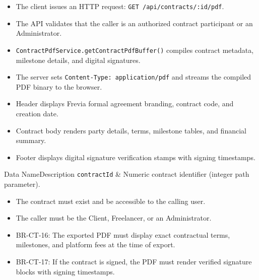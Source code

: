 \begin{itemize}[leftmargin=1.6em,topsep=3pt,itemsep=2pt,parsep=0pt,label=$\bullet$]
      \item The client issues an HTTP request: \texttt{GET /api/contracts/:id/pdf}.
      \item The API validates that the caller is an authorized contract participant or an Administrator.
      \item \texttt{ContractPdfService.getContractPdfBuffer()} compiles contract metadata, milestone details, and digital signatures.
      \item The server sets \texttt{Content-Type: application/pdf} and streams the compiled PDF binary to the browser.
\end{itemize}

\begin{itemize}[leftmargin=1.6em,topsep=3pt,itemsep=2pt,parsep=0pt,label=$\bullet$]
      \item Header displays Frevia formal agreement branding, contract code, and creation date.
      \item Contract body renders party details, terms, milestone tables, and financial summary.
      \item Footer displays digital signature verification stamps with signing timestamps.
\end{itemize}


\begin{specdatatable}{Data Name}{Description}
      \texttt{contractId} & Numeric contract identifier (integer path parameter).\\ \hline
\end{specdatatable}

\begin{itemize}[leftmargin=1.6em,topsep=3pt,itemsep=2pt,parsep=0pt,label=$\bullet$]
      \item The contract must exist and be accessible to the calling user.
      \item The caller must be the Client, Freelancer, or an Administrator.
\end{itemize}

\begin{itemize}[leftmargin=1.6em,topsep=3pt,itemsep=2pt,parsep=0pt,label=$\bullet$]\brrulelist
      \item BR-CT-16: The exported PDF must display exact contractual terms, milestones, and platform fees at the time of export.
      \item BR-CT-17: If the contract is signed, the PDF must render verified signature blocks with signing timestamps.
\end{itemize}

